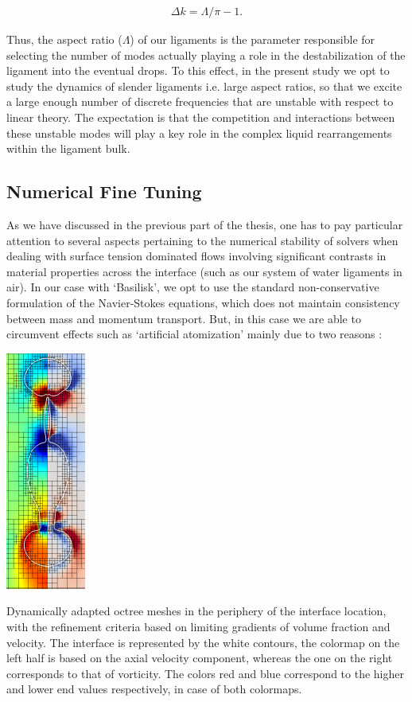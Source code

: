 \begin{align}
 \Delta k = \Lambda / \pi - 1 .  
\end{align}

Thus, the aspect ratio ($\Lambda$) of our ligaments is the parameter 
responsible for selecting the number of modes actually playing a 
role in the destabilization of the ligament into the eventual drops. 
To this effect, in the present study we opt to study the dynamics of 
slender ligaments i.e. large aspect ratios, so that we excite a large enough 
number of discrete frequencies that are unstable with respect to linear theory. 
The expectation is that the competition and interactions 
between these unstable modes will play a key role in the
complex liquid rearrangements within the ligament bulk. 

\subsection*{Numerical Fine Tuning}
As we have discussed in the previous part of the thesis,  
one has to pay particular attention to several aspects pertaining to 
the numerical stability of solvers when dealing with surface tension 
dominated flows involving significant contrasts in material properties 
across the interface (such as our system of water ligaments in air). 
In our case with `Basilisk', we opt to use the standard non-conservative
formulation of the Navier-Stokes equations, which does not maintain 
consistency between mass and momentum transport. 
But, in this case we are able to circumvent effects such as `artificial
atomization' mainly due to two reasons :

\begin{marginfigure}
\centering
\includegraphics{plots/ligament_breakup/lig_mesh.pdf}
\caption{ Dynamically adapted octree meshes in the periphery 
of the interface location, with the refinement criteria based on
limiting gradients of volume fraction and velocity. The interface
is represented by the white contours, the colormap on the left half is
based on the axial velocity component, whereas the one on the right 
corresponds to that of vorticity. 
The colors red and blue correspond to 
the higher and lower end values respectively, in case of both colormaps. 
	}
\label{lig_mesh}
\end{marginfigure}


